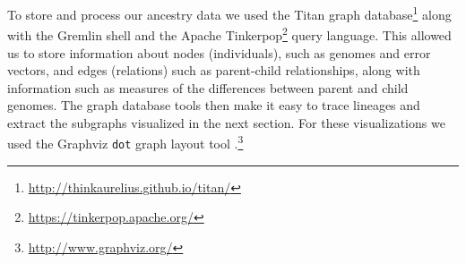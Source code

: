 \documentclass[graybox]{svmult}
\begin{document}
To store and process our ancestry data we used the Titan graph 
database\footnote{\url{http://thinkaurelius.github.io/titan/}} along with the 
Gremlin shell and the Apache Tinkerpop\footnote{\url{https://tinkerpop.apache.org/}} query language. This 
allowed us to store information about nodes (individuals), such as genomes
and error vectors, and edges (relations) such as parent-child relationships,
along with information such as measures of the differences between parent
and child genomes. The graph database tools then make it easy to trace lineages and extract the subgraphs visualized in the next section. For these visualizations we used the
Graphviz \texttt{dot} graph layout tool
.\footnote{\url{http://www.graphviz.org/}}




\end{document}
